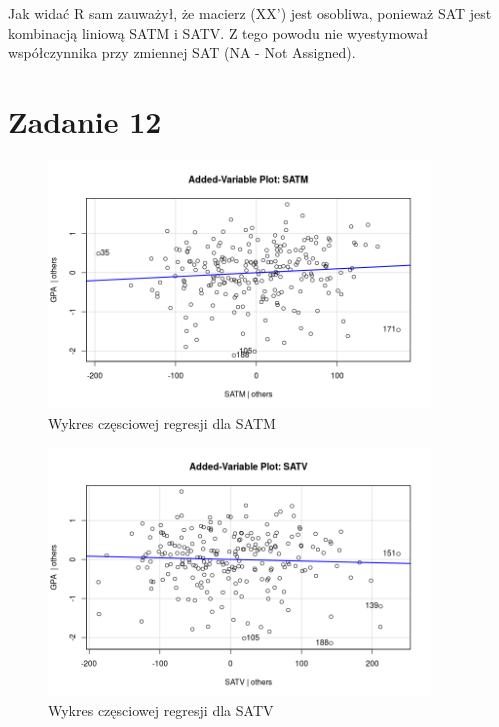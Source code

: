 \documentclass[9pt]{article}  %
\begin{document}
  Jak widać R sam zauważył, że macierz (XX') jest osobliwa, ponieważ SAT jest kombinacją liniową SATM i SATV. Z tego powodu nie wyestymował współczynnika przy zmiennej SAT (NA - Not Assigned).
  


\section{Zadanie 12}

    \begin{figure}[H]
      \centering
      \includegraphics[width=0.9\textwidth]{121.png}
      \caption{Wykres częsciowej regresji dla SATM}
    \end{figure} 


    \begin{figure}[H]
      \centering
      \includegraphics[width=0.9\textwidth]{122.png}
      \caption{Wykres częsciowej regresji dla SATV}
    \end{figure}
    
\end{document}
